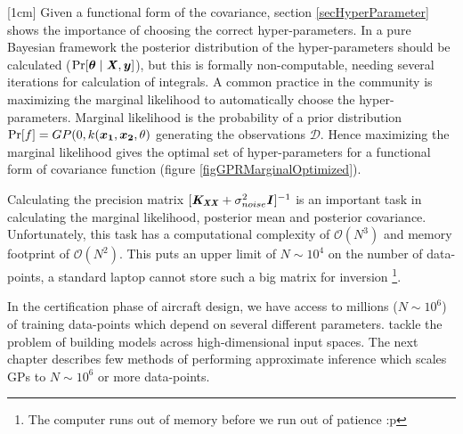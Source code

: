 [1cm]
Given a functional form of the covariance, section \ref{secHyperParameter} shows the importance of choosing the correct hyper-parameters. In a pure Bayesian framework the posterior distribution of the hyper-parameters should be calculated ($\Pr[\boldsymbol{\theta} \mid \bm{\mathit{X}}, \boldsymbol{y}]$), but this is formally non-computable, needing several iterations for calculation of integrals. A common practice in the community is maximizing the marginal likelihood to automatically choose the hyper-parameters. Marginal likelihood is the probability of a prior distribution $\Pr[f] = GP(0, k(\boldsymbol{x_1}, \boldsymbol{x_2}, \theta)$ generating the observations $\mathcal{D}$. Hence maximizing the marginal likelihood gives the optimal set of hyper-parameters for a functional form of covariance function (figure \ref{figGPRMarginalOptimized}). 

Calculating the precision matrix $[\bm{\mathit{K_{XX}}}+ \sigma_{noise}^{2}\bm{\mathit{I}}]^{-1}$ is an important task in calculating the marginal likelihood, posterior mean and posterior covariance. Unfortunately, this task has a computational complexity of $\mathcal{O}\left ( N^{3} \right )$ and memory footprint of $\mathcal{O}\left ( N^{2} \right )$. This puts an upper limit of $N \sim 10^4$ on the number of data-points, a standard laptop cannot store such a big matrix for inversion \footnote{The computer runs out of memory before we run out of patience :p}. 

In the certification phase of aircraft design, we have access to millions ($N \sim 10^6$) of training data-points which depend on several different parameters. \cite{bouhlel2016improved} tackle the problem of building models across high-dimensional input spaces. The next chapter describes few methods of performing approximate inference which scales GPs to $N \sim 10^6$ or more data-points. 

